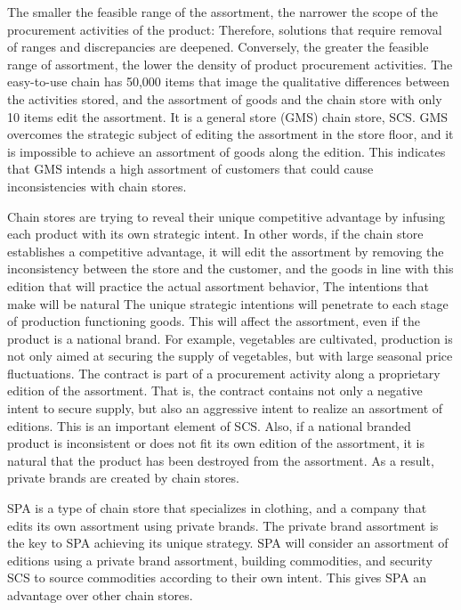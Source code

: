 \documentclass[12pt,a4paper]{article}
\begin{document}
The smaller the feasible range of the assortment, the narrower the scope
of the procurement activities of the product: Therefore, solutions that
require removal of ranges and discrepancies are deepened. Conversely,
the greater the feasible range of assortment, the lower the density of
product procurement activities. The easy-to-use chain has 50,000 items
that image the qualitative differences between the activities stored,
and the assortment of goods and the chain store with only 10 items edit
the assortment. It is a general store (GMS) chain store, SCS. GMS
overcomes the strategic subject of editing the assortment in the store
floor, and it is impossible to achieve an assortment of goods along the
edition. This indicates that GMS intends a high assortment of customers
that could cause inconsistencies with chain stores.

Chain stores are trying to reveal their unique competitive advantage by
infusing each product with its own strategic intent. In other words, if
the chain store establishes a competitive advantage, it will edit the
assortment by removing the inconsistency between the store and the
customer, and the goods in line with this edition that will practice the
actual assortment behavior, The intentions that make will be natural The
unique strategic intentions will penetrate to each stage of production
functioning goods. This will affect the assortment, even if the product
is a national brand. For example, vegetables are cultivated, production
is not only aimed at securing the supply of vegetables, but with large
seasonal price fluctuations. The contract is part of a procurement
activity along a proprietary edition of the assortment. That is, the
contract contains not only a negative intent to secure supply, but also
an aggressive intent to realize an assortment of editions. This is an
important element of SCS. Also, if a national branded product is
inconsistent or does not fit its own edition of the assortment, it is
natural that the product has been destroyed from the assortment. As a
result, private brands are created by chain stores.

SPA is a type of chain store that specializes in clothing, and a company
that edits its own assortment using private brands. The private brand
assortment is the key to SPA achieving its unique strategy. SPA will
consider an assortment of editions using a private brand assortment,
building commodities, and security SCS to source commodities according
to their own intent. This gives SPA an advantage over other chain
stores.
\end{document}
